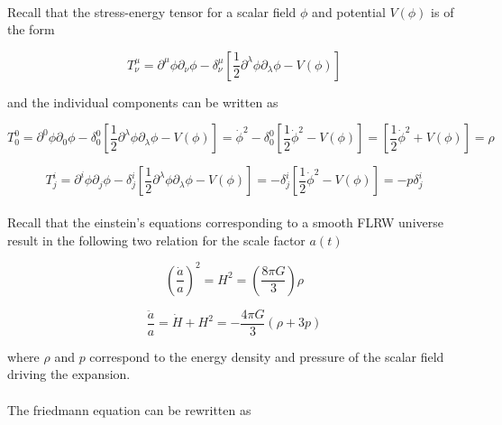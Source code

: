 \documentclass[12pt,a4paper,oneside]{book}
\begin{document}

\paragraph*{} Recall that the stress-energy tensor for a scalar field $\phi$ and potential $V(\phi)$ is of the form

\begin{equation}
T^{\mu}_{\nu} = \partial^{\mu}\phi \partial_{\nu}\phi -\delta^{\mu}_{\nu}[\frac{1}{2}\partial^{\lambda}\phi \partial_{\lambda}\phi - V(\phi)]
\end{equation}

\noindent and the individual components can be written as

\begin{equation}
T^{0}_{0} = \partial^{0}\phi \partial_{0}\phi -\delta^{0}_{0}[\frac{1}{2}\partial^{\lambda}\phi \partial_{\lambda}\phi - V(\phi)] = \dot{\phi}^2 -\delta^{0}_{0}[\frac{1}{2}\dot{\phi}^2 - V(\phi)]
 = [\frac{1}{2}\dot{\phi}^2 +V(\phi)] = \rho 
\end{equation}

\begin{equation}
T^{i}_{j} = \partial^{i}\phi \partial_{j}\phi -\delta^{i}_{j}[\frac{1}{2}\partial^{\lambda}\phi \partial_{\lambda}\phi - V(\phi)]
 = -\delta^{i}_{j}[\frac{1}{2}\dot{\phi}^2 - V(\phi)] = -p\delta^i_j
\end{equation}

\paragraph*{} Recall that the einstein's equations corresponding to a smooth FLRW universe result in the following two relation for the scale factor $a(t)$

\begin{equation}
(\frac{\dot{a}}{a})^2 = H^2 = (\frac{8\pi G}{3})\rho
\end{equation}

\begin{equation}
\frac{\ddot{a}}{a} = \dot{H} + H^2= -\frac{4\pi G}{3}(\rho + 3p)
\end{equation}

\noindent where $\rho$ and $p$ correspond to the energy density and pressure of the scalar field driving the expansion.

\paragraph*{} The friedmann equation can be rewritten as
\end{document}
